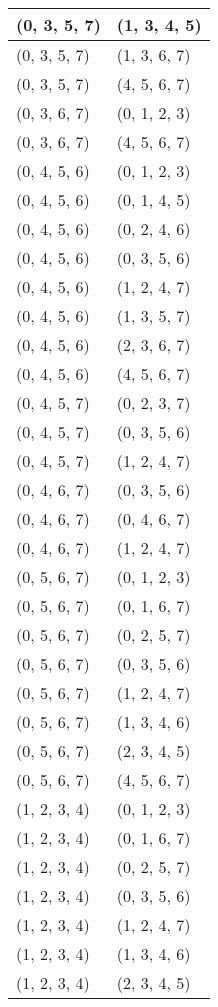 \begin{footnotesize}
\begin{longtable}[c]{|l|l|}
(0, 3, 5, 7)
&(1, 3, 4, 5)
\\ \hline
(0, 3, 5, 7)
&(1, 3, 6, 7)
\\ \hline
(0, 3, 5, 7)
&(4, 5, 6, 7)
\\ \hline
(0, 3, 6, 7)
&(0, 1, 2, 3)
\\ \hline
(0, 3, 6, 7)
&(4, 5, 6, 7)
\\ \hline
(0, 4, 5, 6)
&(0, 1, 2, 3)
\\ \hline
(0, 4, 5, 6)
&(0, 1, 4, 5)
\\ \hline
(0, 4, 5, 6)
&(0, 2, 4, 6)
\\ \hline
(0, 4, 5, 6)
&(0, 3, 5, 6)
\\ \hline
(0, 4, 5, 6)
&(1, 2, 4, 7)
\\ \hline
(0, 4, 5, 6)
&(1, 3, 5, 7)
\\ \hline
(0, 4, 5, 6)
&(2, 3, 6, 7)
\\ \hline
(0, 4, 5, 6)
&(4, 5, 6, 7)
\\ \hline
(0, 4, 5, 7)
&(0, 2, 3, 7)
\\ \hline
(0, 4, 5, 7)
&(0, 3, 5, 6)
\\ \hline
(0, 4, 5, 7)
&(1, 2, 4, 7)
\\ \hline
(0, 4, 6, 7)
&(0, 3, 5, 6)
\\ \hline
(0, 4, 6, 7)
&(0, 4, 6, 7)
\\ \hline
(0, 4, 6, 7)
&(1, 2, 4, 7)
\\ \hline
(0, 5, 6, 7)
&(0, 1, 2, 3)
\\ \hline
(0, 5, 6, 7)
&(0, 1, 6, 7)
\\ \hline
(0, 5, 6, 7)
&(0, 2, 5, 7)
\\ \hline
(0, 5, 6, 7)
&(0, 3, 5, 6)
\\ \hline
(0, 5, 6, 7)
&(1, 2, 4, 7)
\\ \hline
(0, 5, 6, 7)
&(1, 3, 4, 6)
\\ \hline
(0, 5, 6, 7)
&(2, 3, 4, 5)
\\ \hline
(0, 5, 6, 7)
&(4, 5, 6, 7)
\\ \hline
(1, 2, 3, 4)
&(0, 1, 2, 3)
\\ \hline
(1, 2, 3, 4)
&(0, 1, 6, 7)
\\ \hline
(1, 2, 3, 4)
&(0, 2, 5, 7)
\\ \hline
(1, 2, 3, 4)
&(0, 3, 5, 6)
\\ \hline
(1, 2, 3, 4)
&(1, 2, 4, 7)
\\ \hline
(1, 2, 3, 4)
&(1, 3, 4, 6)
\\ \hline
(1, 2, 3, 4)
&(2, 3, 4, 5)
\\ \hline

\end{longtable}
\end{footnotesize}
